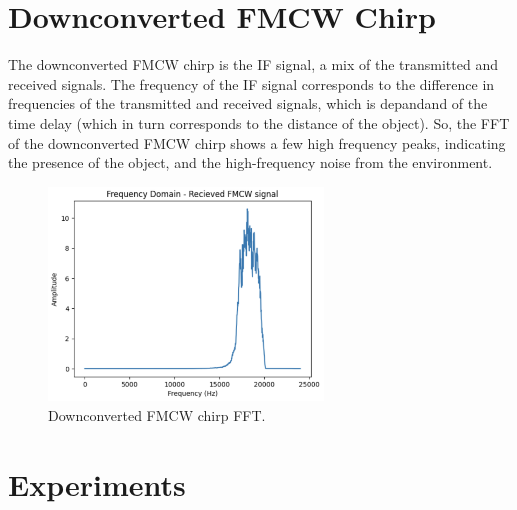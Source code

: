 \documentclass{lab}
\begin{document}
\section{Downconverted FMCW Chirp}

The downconverted FMCW chirp is the IF signal, a mix of the transmitted and received signals. The frequency of the IF signal corresponds to the difference in frequencies of the transmitted and received signals, which is depandand of the time delay (which in turn corresponds to the distance of the object). So, the FFT of the downconverted FMCW chirp shows a few high frequency peaks, indicating the presence of the object, and the high-frequency noise from the environment.

\begin{figure}[h]
    \begin{center}
    \includegraphics[width=0.65\textwidth]{images/receivedFMCW.png} 
    \caption{Downconverted FMCW chirp FFT.}
    \end{center}
\end{figure}

\pagebreak

\section{Experiments}
\end{document}
